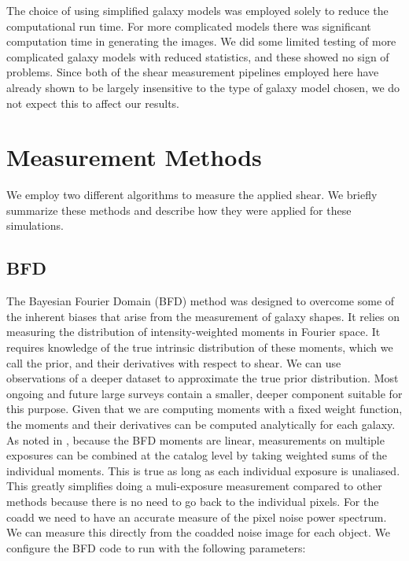 \documentclass[fleqn,useAMS,usenatbib]{mnras}
\begin{document}
The choice of using simplified galaxy models was employed solely to reduce the 
computational run time.  For more complicated models there was significant 
computation time in generating the images.  We did some limited testing of more 
complicated galaxy models with reduced statistics, and these showed no sign of 
problems.  Since both of the shear measurement pipelines employed here have 
already shown to be largely insensitive to the type of galaxy model chosen, we 
do not expect this to affect our results.

\section{Measurement Methods}
\label{Section:Measurement}
We employ two different algorithms to measure the applied shear.  We briefly 
summarize these methods and describe how they were applied for these 
simulations.

\subsection{BFD}
\label{Section:BFD}
The Bayesian Fourier Domain (BFD) method \citep{Bernstein2014,Bernstein2016} 
was designed to overcome some of the inherent biases that arise from the 
measurement of galaxy shapes.  It relies on measuring the distribution of 
intensity-weighted moments in Fourier space.  It requires knowledge of the true 
intrinsic distribution of these moments, which we call the prior, and their 
derivatives with respect to shear.  We can use observations of a deeper dataset 
to approximate the true prior distribution.  Most ongoing and future large 
surveys contain a smaller, deeper component suitable for this purpose.  Given 
that we are computing moments with a fixed weight function, the moments and 
their derivatives can be computed analytically for each galaxy.  
As noted in \cite{Bernstein2016}, because the BFD moments are linear, 
measurements on multiple exposures can be combined at the catalog level by 
taking weighted sums of the individual moments.  This is true as long as each 
individual exposure is unaliased.  This greatly simplifies doing a 
muli-exposure measurement compared to other methods because there is no need to 
go back to the individual pixels.  
For the coadd we need to have an accurate measure of the pixel noise power 
spectrum.  We can measure this directly from the coadded noise image for each 
object.
We configure the BFD code to run with the following parameters:
\end{document}
